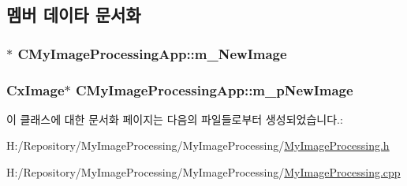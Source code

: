 \subsection{멤버 데이타 문서화}
\hypertarget{class_c_my_image_processing_app_aa5a25236bb1a996bb2c86864d54fba25}{
\subsubsection[{m\-\_\-\-New\-Image}]{$\ast$ C\-My\-Image\-Processing\-App\-::m\-\_\-\-New\-Image}}\label{class_c_my_image_processing_app_aa5a25236bb1a996bb2c86864d54fba25}
\hypertarget{class_c_my_image_processing_app_ad42155c6a3d9aad19b57bb15a06ddda9}{
\subsubsection[{m\-\_\-p\-New\-Image}]{\setlength{\rightskip}{0pt plus 5cm}Cx\-Image$\ast$ C\-My\-Image\-Processing\-App\-::m\-\_\-p\-New\-Image}}\label{class_c_my_image_processing_app_ad42155c6a3d9aad19b57bb15a06ddda9}


이 클래스에 대한 문서화 페이지는 다음의 파일들로부터 생성되었습니다.\-:\begin{DoxyCompactItemize}
\item 
H\-:/\-Repository/\-My\-Image\-Processing/\-My\-Image\-Processing/\hyperlink{_my_image_processing_8h}{My\-Image\-Processing.\-h}\item 
H\-:/\-Repository/\-My\-Image\-Processing/\-My\-Image\-Processing/\hyperlink{_my_image_processing_8cpp}{My\-Image\-Processing.\-cpp}\end{DoxyCompactItemize}
